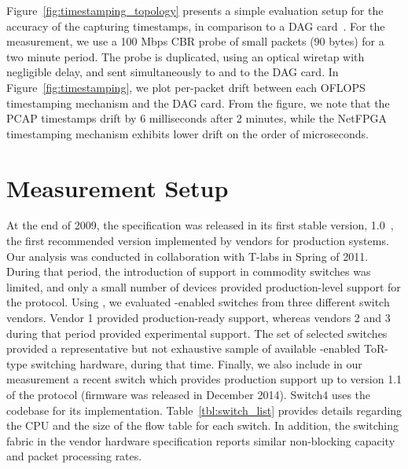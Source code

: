 Figure~\ref{fig:timestamping_topology} presents a simple evaluation setup for
the accuracy of the \oflops capturing timestamps, in comparison to a DAG
card~. For the measurement, we use a 100 Mbps CBR probe of
small packets (90 bytes) for a two minute period. The probe is duplicated, using an optical
wiretap with negligible delay, and sent simultaneously to \oflops and to the DAG
card. In Figure~\ref{fig:timestamping}, we plot per-packet drift between each
OFLOPS timestamping mechanism and the DAG card. From the figure, we note that
the PCAP timestamps drift by 6 milliseconds after 2 minutes, while the NetFPGA
timestamping mechanism exhibits lower drift on the order of microseconds.




\section{Measurement Setup}\label{sec:oflops-switches}

At the end of 2009, the \of specification was released in its first
stable version, 1.0~, the first recommended version
implemented by vendors for production systems.  Our analysis was conducted in
collaboration with T-labs in Spring of 2011. During that period, the
introduction of \of support in commodity switches was limited, and only a small
number of devices provided production-level support for the protocol.  Using
\oflops, we evaluated \of-enabled switches from three different switch vendors.
Vendor 1 provided production-ready \of support, whereas vendors 2 and 3 during
that period provided experimental \of support. The set of selected switches
provided a representative but not exhaustive sample of available \of-enabled
ToR-type switching hardware, during that time. Finally, we also include in our
measurement a recent \of switch which provides production support up
to version 1.1 of the protocol (firmware was released in December
2014).  Switch4 uses the \ovs codebase for its implementation. 
Table~\ref{tbl:switch_list} provides details regarding the CPU and the size of
the flow table for each switch. In addition, the switching fabric in the vendor
hardware specification reports similar non-blocking capacity and packet
processing rates. 

